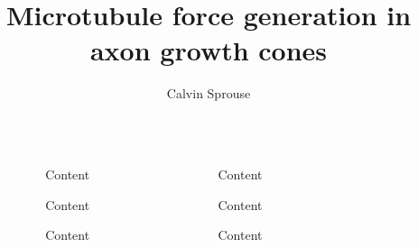 \documentclass[final]{beamer}
\title{Microtubule force generation in axon growth cones}
\author{Calvin Sprouse}
\institute[CWU]{Department of Physics, Central Washington University}
\newlength{\sepwidth}
\newlength{\colwidth}
\newcommand{\separatorcolumn}{\begin{column}{\sepwidth}\end{column}}
\begin{document}
\begin{frame}[t]
\begin{columns}[t]
\separatorcolumn%

\begin{column}{\colwidth}

\begin{block}{Content}
\end{block}

\begin{block}{Content}
\end{block}

\begin{block}{Content}
\end{block}

\end{column}
\separatorcolumn%


\begin{column}{\colwidth}

\begin{block}{Content}
\end{block}

\begin{block}{Content}
\end{block}

\begin{block}{Content}
\end{block}

\end{column}
\separatorcolumn%

\begin{column}{\colwidth}


\end{column}
\end{columns}
\end{frame}
\end{document}
